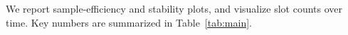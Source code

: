 We report sample-efficiency and stability plots, and visualize slot counts over time. Key numbers are summarized in Table~\ref{tab:main}.